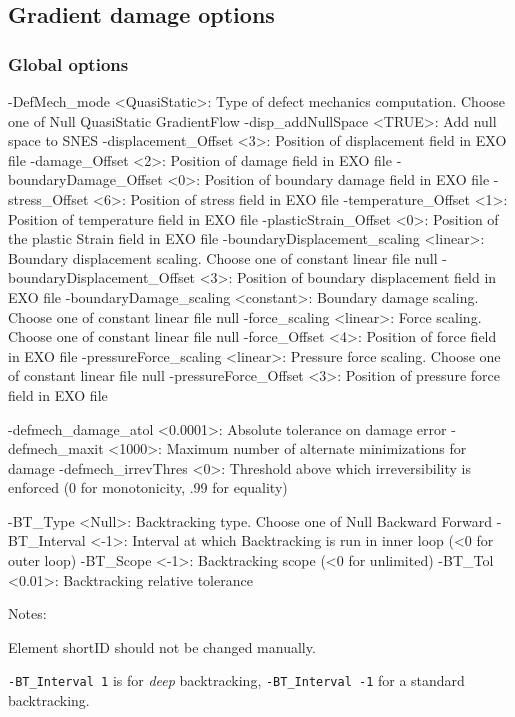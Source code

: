 \documentclass[10pt,oneside]{memoir}
\begin{document}
\subsection{Gradient damage options}
\subsubsection{Global options}
\small{\begin{boxedverbatim}
-DefMech_mode <QuasiStatic>: Type of defect mechanics computation. 
                             Choose one of Null QuasiStatic GradientFlow
-disp_addNullSpace <TRUE>: Add null space to SNES 
-displacement_Offset <3>: Position of displacement field in EXO file 
-damage_Offset <2>: Position of damage field in EXO file 
-boundaryDamage_Offset <0>: Position of boundary damage field in EXO file 
-stress_Offset <6>: Position of stress field in EXO file 
-temperature_Offset <1>: Position of temperature field in EXO file 
-plasticStrain_Offset <0>: Position of the plastic Strain field in EXO file 
-boundaryDisplacement_scaling <linear>: Boundary displacement scaling.
                                        Choose one of constant linear file null
-boundaryDisplacement_Offset <3>: Position of boundary displacement field in EXO file 
-boundaryDamage_scaling <constant>: Boundary damage scaling.
                                    Choose one of constant linear file null
-force_scaling <linear>: Force scaling. 
                         Choose one of constant linear file null
-force_Offset <4>: Position of force field in EXO file 
-pressureForce_scaling <linear>: Pressure force scaling. 
                                 Choose one of constant linear file null
-pressureForce_Offset <3>: Position of pressure force field in EXO file 

-defmech_damage_atol <0.0001>: Absolute tolerance on damage error 
-defmech_maxit <1000>: Maximum number of alternate minimizations for damage 
-defmech_irrevThres <0>: Threshold above which irreversibility is enforced 
                        (0 for monotonicity, .99 for equality) 

-BT_Type <Null>: Backtracking type.
                 Choose one of Null Backward Forward
-BT_Interval <-1>: Interval at which Backtracking is run in inner loop 
                   (<0 for outer loop) 
-BT_Scope <-1>: Backtracking scope (<0 for unlimited) 
-BT_Tol <0.01>: Backtracking relative tolerance 
\end{boxedverbatim}}
Notes:
\begin{compactenum}
\item Element shortID should not be changed manually. 
\item \verb+-BT_Interval 1+ is for \emph{deep} backtracking, \verb+-BT_Interval -1+ for a standard backtracking.
\end{compactenum}
\end{document}
